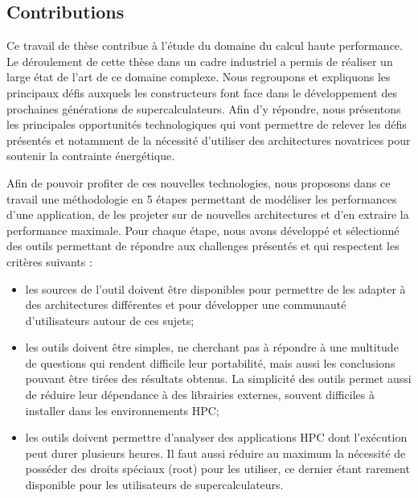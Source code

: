     \subsection{Contributions}
    
        Ce travail de thèse contribue à l'étude du domaine du calcul haute performance. Le déroulement de cette thèse dans un cadre industriel a permis de réaliser un large état de l'art de ce domaine complexe. Nous regroupons et expliquons les principaux défis auxquels les constructeurs font face dans le développement des prochaines générations de supercalculateurs. Afin d'y répondre, nous présentons les principales opportunités technologiques qui vont permettre de relever les défis présentés et notamment de la nécessité d'utiliser des architectures novatrices pour soutenir la contrainte énergétique.
        
        Afin de pouvoir profiter de ces nouvelles technologies, nous proposons dans ce travail une méthodologie en 5 étapes permettant de modéliser les performances d'une application, de les projeter sur de nouvelles architectures et d'en extraire la performance maximale. Pour chaque étape, nous avons développé et sélectionné des outils permettant de répondre aux challenges présentés et qui respectent les critères suivants :
        \begin{itemize}
            \item les sources de l'outil doivent être disponibles pour permettre de les adapter à des architectures différentes et pour développer une communauté d'utilisateurs autour de ces sujets;
            \item les outils doivent être simples, ne cherchant pas à répondre à une multitude de questions qui rendent difficile leur portabilité, mais aussi les conclusions pouvant être tirées des résultats obtenus. La simplicité des outils permet aussi de réduire leur dépendance à des librairies externes, souvent difficiles à installer dans les environnements HPC;
            \item les outils doivent permettre d'analyser des applications HPC dont l'exécution peut durer plusieurs heures. Il faut aussi réduire au maximum la nécessité de posséder des droits spéciaux (root) pour les utiliser, ce dernier étant rarement disponible pour les utilisateurs de supercalculateurs.
        \end{itemize}
 
